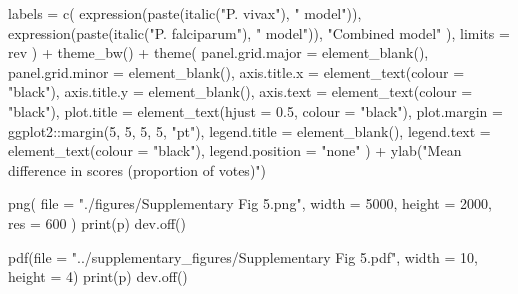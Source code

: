 \documentclass[
  11pt,
  oneside]{book}
\newenvironment{Shaded}{\begin{snugshade}}{\end{snugshade}}
\newcommand{\AttributeTok}[1]{\textcolor[rgb]{0.77,0.63,0.00}{#1}}
\newcommand{\DecValTok}[1]{\textcolor[rgb]{0.00,0.00,0.81}{#1}}
\newcommand{\FloatTok}[1]{\textcolor[rgb]{0.00,0.00,0.81}{#1}}
\newcommand{\FunctionTok}[1]{\textcolor[rgb]{0.00,0.00,0.00}{#1}}
\newcommand{\NormalTok}[1]{#1}
\newcommand{\SpecialCharTok}[1]{\textcolor[rgb]{0.00,0.00,0.00}{#1}}
\newcommand{\StringTok}[1]{\textcolor[rgb]{0.31,0.60,0.02}{#1}}
\begin{document}
\begin{Shaded}
\begin{Highlighting}[]
    \AttributeTok{labels =} \FunctionTok{c}\NormalTok{(}
      \FunctionTok{expression}\NormalTok{(}\FunctionTok{paste}\NormalTok{(}\FunctionTok{italic}\NormalTok{(}\StringTok{"P. vivax"}\NormalTok{), }\StringTok{" model"}\NormalTok{)),}
      \FunctionTok{expression}\NormalTok{(}\FunctionTok{paste}\NormalTok{(}\FunctionTok{italic}\NormalTok{(}\StringTok{"P. falciparum"}\NormalTok{), }\StringTok{" model"}\NormalTok{)),}
      \StringTok{"Combined model"}
\NormalTok{    ),}
    \AttributeTok{limits =}\NormalTok{ rev}
\NormalTok{  ) }\SpecialCharTok{+}
  \FunctionTok{theme\_bw}\NormalTok{() }\SpecialCharTok{+}
  \FunctionTok{theme}\NormalTok{(}
    \AttributeTok{panel.grid.major =} \FunctionTok{element\_blank}\NormalTok{(),}
    \AttributeTok{panel.grid.minor =} \FunctionTok{element\_blank}\NormalTok{(),}
    \AttributeTok{axis.title.x =} \FunctionTok{element\_text}\NormalTok{(}\AttributeTok{colour =} \StringTok{"black"}\NormalTok{),}
    \AttributeTok{axis.title.y =} \FunctionTok{element\_blank}\NormalTok{(),}
    \AttributeTok{axis.text =} \FunctionTok{element\_text}\NormalTok{(}\AttributeTok{colour =} \StringTok{"black"}\NormalTok{),}
    \AttributeTok{plot.title =} \FunctionTok{element\_text}\NormalTok{(}\AttributeTok{hjust =} \FloatTok{0.5}\NormalTok{, }\AttributeTok{colour =} \StringTok{"black"}\NormalTok{),}
    \AttributeTok{plot.margin =}\NormalTok{ ggplot2}\SpecialCharTok{::}\FunctionTok{margin}\NormalTok{(}\DecValTok{5}\NormalTok{, }\DecValTok{5}\NormalTok{, }\DecValTok{5}\NormalTok{, }\DecValTok{5}\NormalTok{, }\StringTok{"pt"}\NormalTok{),}
    \AttributeTok{legend.title =} \FunctionTok{element\_blank}\NormalTok{(),}
    \AttributeTok{legend.text =} \FunctionTok{element\_text}\NormalTok{(}\AttributeTok{colour =} \StringTok{"black"}\NormalTok{),}
    \AttributeTok{legend.position =} \StringTok{"none"}
\NormalTok{  ) }\SpecialCharTok{+}
  \FunctionTok{ylab}\NormalTok{(}\StringTok{"Mean difference in scores (proportion of votes)"}\NormalTok{)}
\end{Highlighting}
\end{Shaded}

\begin{Shaded}
\begin{Highlighting}[]
\FunctionTok{png}\NormalTok{(}
  \AttributeTok{file =} \StringTok{"./figures/Supplementary Fig 5.png"}\NormalTok{,}
  \AttributeTok{width =} \DecValTok{5000}\NormalTok{, }\AttributeTok{height =} \DecValTok{2000}\NormalTok{, }\AttributeTok{res =} \DecValTok{600}
\NormalTok{)}
\FunctionTok{print}\NormalTok{(p)}
\FunctionTok{dev.off}\NormalTok{()}

\FunctionTok{pdf}\NormalTok{(}\AttributeTok{file =} \StringTok{"../supplementary\_figures/Supplementary Fig 5.pdf"}\NormalTok{, }\AttributeTok{width =} \DecValTok{10}\NormalTok{, }\AttributeTok{height =} \DecValTok{4}\NormalTok{)}
\FunctionTok{print}\NormalTok{(p)}
\FunctionTok{dev.off}\NormalTok{()}
\end{Highlighting}
\end{Shaded}
\end{document}
